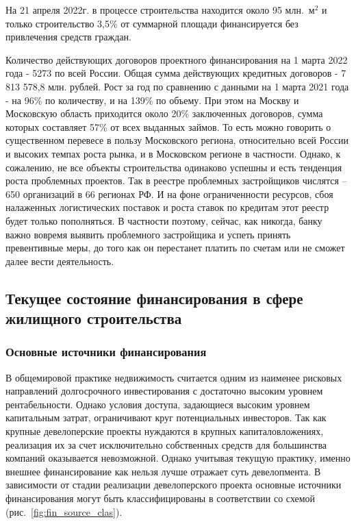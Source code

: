 \documentclass[12pt,a4paper]{article} %
\begin{document}
На 21 апреля 2022г. в процессе строительства находится около 95 млн.~$\text{м}^2$ и только строительство 3,5\% от суммарной площади финансируется без привлечения средств граждан\cite{domrf}.
 
Количество действующих договоров проектного финансирования на 1 марта 2022 года - 5273 по всей России\cite{cb}. Общая сумма действующих кредитных договоров - 7 813 578,8 млн. рублей.
Рост за год по сравнению с данными на 1 марта 2021 года - на 96\% по количеству, и на 139\% по объему.
При этом на Москву и Московскую область приходится около 20\% заключенных договоров, сумма которых составляет 57\% от всех выданных займов. То есть можно говорить о существенном перевесе в пользу Московского региона, относительно всей России и высоких темпах роста рынка, и в Московском регионе в частности. Однако, к сожалению, не все объекты строительства одинаково успешны и есть тенденция роста проблемных проектов. Так в реестре проблемных застройщиков числятся – 650 организаций в 66 регионах РФ\cite{domrf}. И на фоне ограниченности ресурсов, сбоя налаженных логистических поставок и роста ставок по кредитам этот реестр будет только пополняться. В частности поэтому, сейчас, как никогда, банку важно вовремя выявить проблемного застройщика и успеть принять превентивные меры, до того как он перестанет платить по счетам или не сможет далее вести деятельность.  

\subsection{Текущее состояние финансирования в сфере жилищного строительства}

\subsubsection{Основные источники финансирования }

В общемировой практике недвижимость считается одним из наименее рисковых направлений долгосрочного инвестирования с достаточно высоким уровнем рентабельности. Однако условия доступа, задающиеся высоким уровнем капитальным затрат, ограничивают круг потенциальных инвесторов. Так как крупные девелоперские проекты нуждаются в крупных капиталовложениях, реализация их за счет исключительно собственных средств для большинства компаний оказывается невозможной. Однако учитывая текущую практику, именно внешнее финансирование как нельзя лучше отражает суть девелопмента.
В зависимости от стадии реализации девелоперского проекта основные источники финансирования могут быть классифицированы в соответствии со схемой\cite{Hiefez} (рис.~\ref{fig:fin_source_clas}). 
\end{document}
